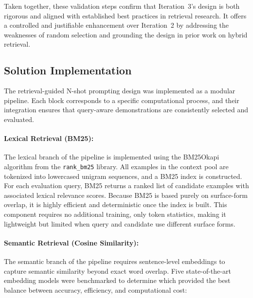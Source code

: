 Taken together, these validation steps confirm that Iteration~3’s design is both rigorous and aligned with established best practices in retrieval research. 
It offers a controlled and justifiable enhancement over Iteration~2 by addressing the weaknesses of random selection and grounding the design in prior work on hybrid retrieval.
\subsection{Solution Implementation}

The retrieval-guided N-shot prompting design was implemented as a modular pipeline. Each block corresponds to a specific computational process, and their integration ensures that query-aware demonstrations are consistently selected and evaluated.  

\paragraph{Lexical Retrieval (BM25):}  
The lexical branch of the pipeline is implemented using the BM25Okapi algorithm from the \texttt{rank\_bm25} library. 
All examples in the context pool are tokenized into lowercased unigram sequences, and a BM25 index is constructed. 
For each evaluation query, BM25 returns a ranked list of candidate examples with associated lexical relevance scores. 
Because BM25 is based purely on surface-form overlap, it is highly efficient and deterministic once the index is built. 
This component requires no additional training, only token statistics, making it lightweight but limited when query and candidate use different surface forms.  

\paragraph{Semantic Retrieval (Cosine Similarity):}  
The semantic branch of the pipeline requires sentence-level embeddings to capture semantic similarity beyond exact word overlap. 
Five state-of-the-art embedding models were benchmarked to determine which provided the best balance between accuracy, efficiency, and computational cost:  

